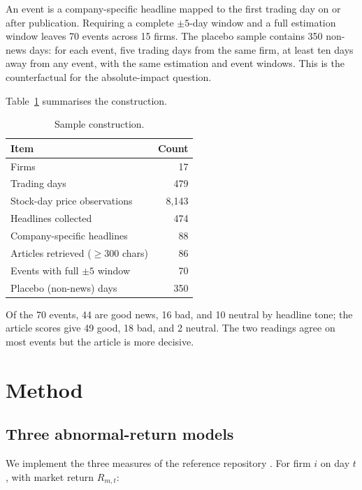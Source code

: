 \documentclass[10pt,twocolumn,a4paper]{article}
\begin{document}
An event is a company-specific headline mapped to the first trading day on or after publication.
Requiring a complete $\pm5$-day window and a full estimation window leaves 70 events across 15 firms.
The placebo sample contains 350 non-news days: for each event, five trading days from the same firm, at
least ten days away from any event, with the same estimation and event windows. This is the
counterfactual for the absolute-impact question.

Table~\ref{tab:sample} summarises the construction.

\begin{table}[t]
\centering
\small
\begin{threeparttable}
\caption{Sample construction.}
\label{tab:sample}
\begin{tabular}{@{}lr@{}}
\toprule
Item & Count \\
\midrule
Firms & 17 \\
Trading days & 479 \\
Stock-day price observations & 8,143 \\
Headlines collected & 474 \\
Company-specific headlines & 88 \\
Articles retrieved ($\geq$300 chars) & 86 \\
Events with full $\pm5$ window & 70 \\
Placebo (non-news) days & 350 \\
\bottomrule
\end{tabular}
\end{threeparttable}
\end{table}

Of the 70 events, 44 are good news, 16 bad, and 10 neutral by headline tone; the article scores give
49 good, 18 bad, and 2 neutral. The two readings agree on most events but the article is more decisive.

\section{Method}

\subsection{Three abnormal-return models}

We implement the three measures of the reference repository \citep{asiqlab2021repo}. For firm $i$ on
day $t$, with market return $R_{m,t}$:
\end{document}
